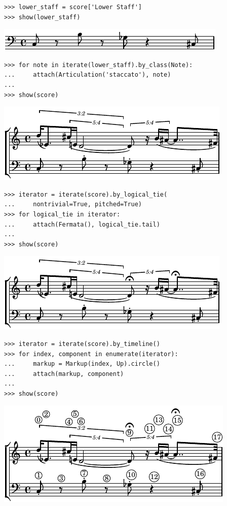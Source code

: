 \documentclass{article}
\begin{document}
\begin{lstlisting}
>>> lower_staff = score['Lower Staff']
>>> show(lower_staff)
\end{lstlisting}

\includegraphics[scale=1.0]{images/abjad-4.pdf}


\begin{lstlisting}
>>> for note in iterate(lower_staff).by_class(Note):
...     attach(Articulation('staccato'), note)
... 
>>> show(score)
\end{lstlisting}

\includegraphics[scale=1.0]{images/abjad-5.pdf}


\begin{lstlisting}
>>> iterator = iterate(score).by_logical_tie(
...     nontrivial=True, pitched=True)
>>> for logical_tie in iterator:
...     attach(Fermata(), logical_tie.tail)
... 
>>> show(score)
\end{lstlisting}

\includegraphics[scale=1.0]{images/abjad-6.pdf}


\begin{lstlisting}
>>> iterator = iterate(score).by_timeline()
>>> for index, component in enumerate(iterator):
...     markup = Markup(index, Up).circle()
...     attach(markup, component)
... 
>>> show(score)
\end{lstlisting}

\includegraphics[scale=1.0]{images/abjad-7.pdf}
\end{document}
